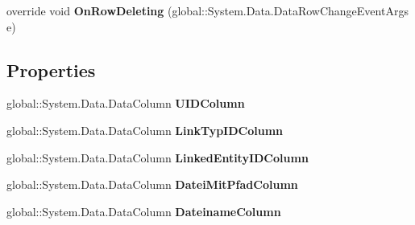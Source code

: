 \begin{DoxyCompactItemize}
\item 
override void {\bfseries On\+Row\+Deleting} (global\+::\+System.\+Data.\+Data\+Row\+Change\+Event\+Args e)\hypertarget{class_products_1_1_data_1_1ds_sage_1_1_dateilink_data_table_a8be66b8a6e725d244bae72786de24500}{}\label{class_products_1_1_data_1_1ds_sage_1_1_dateilink_data_table_a8be66b8a6e725d244bae72786de24500}

\end{DoxyCompactItemize}
\subsection*{Properties}
\begin{DoxyCompactItemize}
\item 
global\+::\+System.\+Data.\+Data\+Column {\bfseries U\+I\+D\+Column}\hypertarget{class_products_1_1_data_1_1ds_sage_1_1_dateilink_data_table_ab11c15cefc99e6f1e0f5e14d259d7906}{}\label{class_products_1_1_data_1_1ds_sage_1_1_dateilink_data_table_ab11c15cefc99e6f1e0f5e14d259d7906}

\item 
global\+::\+System.\+Data.\+Data\+Column {\bfseries Link\+Typ\+I\+D\+Column}\hypertarget{class_products_1_1_data_1_1ds_sage_1_1_dateilink_data_table_a51dcde09ff922d0f7a257524ae859a5c}{}\label{class_products_1_1_data_1_1ds_sage_1_1_dateilink_data_table_a51dcde09ff922d0f7a257524ae859a5c}

\item 
global\+::\+System.\+Data.\+Data\+Column {\bfseries Linked\+Entity\+I\+D\+Column}\hypertarget{class_products_1_1_data_1_1ds_sage_1_1_dateilink_data_table_a4893ac5c688144a34441aa80297e60e0}{}\label{class_products_1_1_data_1_1ds_sage_1_1_dateilink_data_table_a4893ac5c688144a34441aa80297e60e0}

\item 
global\+::\+System.\+Data.\+Data\+Column {\bfseries Datei\+Mit\+Pfad\+Column}\hypertarget{class_products_1_1_data_1_1ds_sage_1_1_dateilink_data_table_a4c18d08c25902550e98e42c1c11a8dd9}{}\label{class_products_1_1_data_1_1ds_sage_1_1_dateilink_data_table_a4c18d08c25902550e98e42c1c11a8dd9}

\item 
global\+::\+System.\+Data.\+Data\+Column {\bfseries Dateiname\+Column}\hypertarget{class_products_1_1_data_1_1ds_sage_1_1_dateilink_data_table_a9ff2fb83aafc1c92a77b230ad6fc2173}{}\label{class_products_1_1_data_1_1ds_sage_1_1_dateilink_data_table_a9ff2fb83aafc1c92a77b230ad6fc2173}


\end{DoxyCompactItemize}
